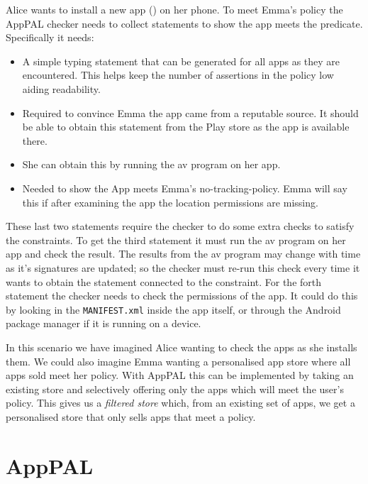 \documentclass[]{llncs}
\begin{document}
Alice wants to install a new app () on her phone.
To meet Emma's policy the AppPAL checker needs to collect statements to show the app meets the  predicate.
Specifically it needs:
\begin{itemize}
  \item{}
    A simple typing statement that can be generated for all apps as they are encountered.
    This helps keep the number of assertions in the policy low aiding readability.
  \item{}
    Required to convince Emma the app came from a reputable source.
    It should be able to obtain this statement from the Play store as the app is available there.
  \item{}
    She can obtain this by running the \ac{av} program on her app.
  \item{}
    Needed to show the App meets Emma's no-tracking-policy.
    Emma will say this if after examining the app the location permissions are missing.
\end{itemize}
These last two statements require the checker to do some extra checks to satisfy the constraints.
To get the third statement it must run the \ac{av} program on her app and check the result.
The results from the \ac{av} program may change with time as it's signatures are updated;
  so the checker must re-run this check every time it wants to obtain the statement connected to the constraint.
For the forth statement the checker needs to check the permissions of the app.
It could do this by looking in the \texttt{MANIFEST.xml} inside the app itself, or through the Android package manager if it is running on a device.

In this scenario we have imagined Alice wanting to check the apps as she installs them.
We could also imagine Emma wanting a personalised app store where all apps sold meet her policy.
With AppPAL this can be implemented by taking an existing store and selectively offering only the apps which will meet the user's policy.
This gives us a \emph{filtered store} which, from an existing set of apps, we get a personalised store that only sells apps that meet a policy.

\section{AppPAL}
\label{sec:details}
\label{ssec:language}
\end{document}
